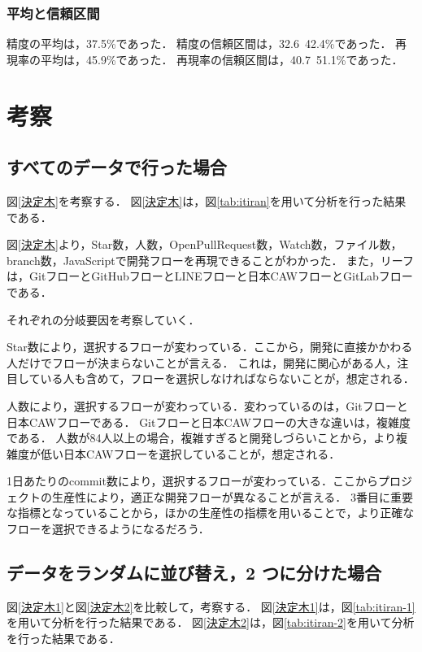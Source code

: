 \subsection{平均と信頼区間}
精度の平均は，37.5\%であった．
精度の信頼区間は，32.6~42.4\%であった．
再現率の平均は，45.9\%であった．
再現率の信頼区間は，40.7~51.1\%であった．

\chapter{考察}



\section{すべてのデータで行った場合}
図\ref{決定木}を考察する．
図\ref{決定木}は，図\ref{tab:itiran}を用いて分析を行った結果である．

図\ref{決定木}より，Star数，人数，OpenPullRequest数，Watch数，ファイル数，branch数，JavaScriptで開発フローを再現できることがわかった．
また，リーフは，GitフローとGitHubフローとLINEフローと日本CAWフローとGitLabフローである．

それぞれの分岐要因を考察していく．

Star数により，選択するフローが変わっている．ここから，開発に直接かかわる人だけでフローが決まらないことが言える．
これは，開発に関心がある人，注目している人も含めて，フローを選択しなければならないことが，想定される．

人数により，選択するフローが変わっている．変わっているのは，Gitフローと日本CAWフローである．
Gitフローと日本CAWフローの大きな違いは，複雑度である．
人数が84人以上の場合，複雑すぎると開発しづらいことから，より複雑度が低い日本CAWフローを選択していることが，想定される．

1日あたりのcommit数により，選択するフローが変わっている．ここからプロジェクトの生産性により，適正な開発フローが異なることが言える．
3番目に重要な指標となっていることから，ほかの生産性の指標を用いることで，より正確なフローを選択できるようになるだろう．

\section{データをランダムに並び替え，2 つに分けた場合}
図\ref{決定木1}と図\ref{決定木2}を比較して，考察する．
図\ref{決定木1}は，図\ref{tab:itiran-1}を用いて分析を行った結果である．
図\ref{決定木2}は，図\ref{tab:itiran-2}を用いて分析を行った結果である．

